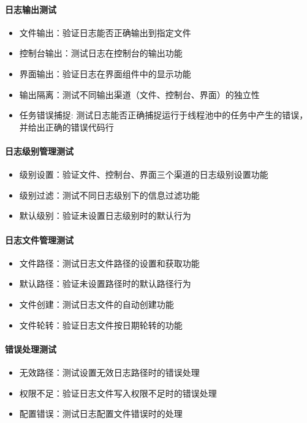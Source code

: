 \documentclass[a4paper,12pt]{report}	%
\begin{document}
\paragraph{日志输出测试}
\begin{itemize}
    \item 文件输出：验证日志能否正确输出到指定文件
    \item 控制台输出：测试日志在控制台的输出功能
    \item 界面输出：验证日志在界面组件中的显示功能
    \item 输出隔离：测试不同输出渠道（文件、控制台、界面）的独立性
    \item 任务错误捕捉: 测试日志能否正确捕捉运行于线程池中的任务中产生的错误，并给出正确的错误代码行
\end{itemize}

\paragraph{日志级别管理测试}
\begin{itemize}
    \item 级别设置：验证文件、控制台、界面三个渠道的日志级别设置功能
    \item 级别过滤：测试不同日志级别下的信息过滤功能
    \item 默认级别：验证未设置日志级别时的默认行为
\end{itemize}

\paragraph{日志文件管理测试}
\begin{itemize}
    \item 文件路径：测试日志文件路径的设置和获取功能
    \item 默认路径：验证未设置路径时的默认路径行为
    \item 文件创建：测试日志文件的自动创建功能
    \item 文件轮转：验证日志文件按日期轮转的功能
\end{itemize}

\paragraph{错误处理测试}
\begin{itemize}
    \item 无效路径：测试设置无效日志路径时的错误处理
    \item 权限不足：验证日志文件写入权限不足时的错误处理
    \item 配置错误：测试日志配置文件错误时的处理
\end{itemize}
\end{document}
